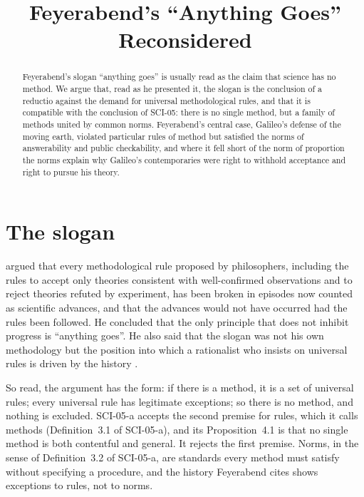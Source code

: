 \documentclass{situationist-preprint}
\title{Feyerabend's \enquote{Anything Goes} Reconsidered}
\begin{document}
\maketitle

\begin{abstract}
Feyerabend's slogan \enquote{anything goes} is usually read as the claim that science has no method. We argue that, read as he presented it, the slogan is the conclusion of a reductio against the demand for universal methodological rules, and that it is compatible with the conclusion of SCI-05: there is no single method, but a family of methods united by common norms. Feyerabend's central case, Galileo's defense of the moving earth, violated particular rules of method but satisfied the norms of answerability and public checkability, and where it fell short of the norm of proportion the norms explain why Galileo's contemporaries were right to withhold acceptance and right to pursue his theory.
\end{abstract}

\section{The slogan}\label{s:slogan}

\citet{Feyerabend1975} argued that every methodological rule proposed by philosophers, including the rules to accept only theories consistent with well-confirmed observations and to reject theories refuted by experiment, has been broken in episodes now counted as scientific advances, and that the advances would not have occurred had the rules been followed. He concluded that the only principle that does not inhibit progress is \enquote{anything goes}. He also said that the slogan was not his own methodology but the position into which a rationalist who insists on universal rules is driven by the history \citep{Feyerabend1978}.

So read, the argument has the form: if there is a method, it is a set of universal rules; every universal rule has legitimate exceptions; so there is no method, and nothing is excluded. SCI-05-a accepts the second premise for rules, which it calls methods (Definition~3.1 of SCI-05-a), and its Proposition~4.1 is that no single method is both contentful and general. It rejects the first premise. Norms, in the sense of Definition~3.2 of SCI-05-a, are standards every method must satisfy without specifying a procedure, and the history Feyerabend cites shows exceptions to rules, not to norms.
\end{document}
